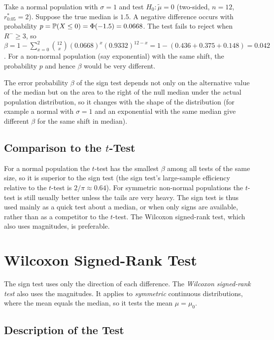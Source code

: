 \begin{example}
Take a normal population with $\sigma=1$ and test $H_0:\tilde\mu=0$ (two-sided, $n=12$, $r^*_{0.05}=2$). Suppose the true median is $1.5$. A negative difference occurs with probability $p=\mathbb{P}(X\le0)=\Phi(-1.5)=0.0668$. The test fails to reject when $R^-\ge3$, so $\beta=1-\sum_{x=0}^2\binom{12}x(0.0668)^x(0.9332)^{12-x}=1-(0.436+0.375+0.148)=0.042$. For a non-normal population (say exponential) with the same shift, the probability $p$ and hence $\beta$ would be very different.
\end{example}

The error probability $\beta$ of the sign test depends not only on the alternative value of the median but on the area to the right of the null median under the actual population distribution, so it changes with the shape of the distribution (for example a normal with $\sigma=1$ and an exponential with the same median give different $\beta$ for the same shift in median).

\subsection{Comparison to the $t$-Test}

For a normal population the $t$-test has the smallest $\beta$ among all tests of the same size, so it is superior to the sign test (the sign test's large-sample efficiency relative to the $t$-test is $2/\pi\approx0.64$). For symmetric non-normal populations the $t$-test is still usually better unless the tails are very heavy. The sign test is thus used mainly as a quick test about a median, or when only signs are available, rather than as a competitor to the $t$-test. The Wilcoxon signed-rank test, which also uses magnitudes, is preferable.

\section{Wilcoxon Signed-Rank Test}

The sign test uses only the direction of each difference. The \emph{Wilcoxon signed-rank test} also uses the magnitudes. It applies to \emph{symmetric} continuous distributions, where the mean equals the median, so it tests the mean $\mu=\mu_0$.

\subsection{Description of the Test}

